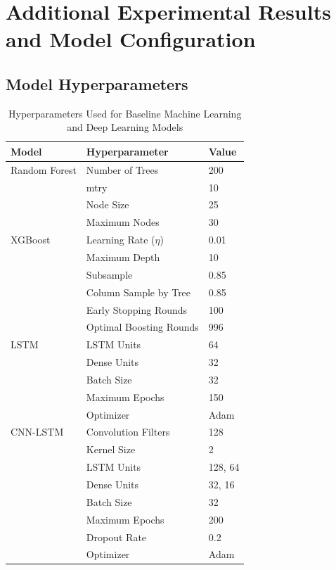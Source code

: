 \appendix

\chapter{Additional Experimental Results and Model Configuration}

\section{Model Hyperparameters}

\begin{table}[H]
	\centering
	\caption{Hyperparameters Used for Baseline Machine Learning and Deep Learning Models}
	\label{tab:model_hyperparameters}
	\small
	\begin{tabular}{p{3cm}p{5cm}p{3cm}}
		\hline
		Model & Hyperparameter & Value \\
		\hline
		
		Random Forest & Number of Trees & 200 \\
	 & mtry & 10 \\
		 & Node Size & 25 \\
	 & Maximum Nodes & 30 \\
		\hline
		
		XGBoost & Learning Rate ($\eta$) & 0.01 \\
		& Maximum Depth & 10 \\
		 & Subsample & 0.85 \\
		 & Column Sample by Tree & 0.85 \\
		 & Early Stopping Rounds & 100 \\
		 & Optimal Boosting Rounds & 996 \\
		\hline
		
		LSTM & LSTM Units & 64 \\
		 & Dense Units & 32 \\
	 & Batch Size & 32 \\
		 & Maximum Epochs & 150 \\
		 & Optimizer & Adam \\
		\hline
		
		CNN-LSTM & Convolution Filters & 128 \\
		 & Kernel Size & 2 \\
	 & LSTM Units & 128, 64 \\
	 & Dense Units & 32, 16 \\
	 & Batch Size & 32 \\
		& Maximum Epochs & 200 \\
		 & Dropout Rate & 0.2 \\
	 & Optimizer & Adam \\
		\hline
		

\end{tabular}
\end{table}
